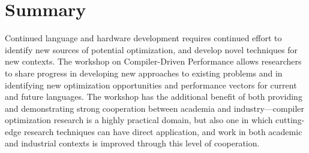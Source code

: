 \documentclass[sigconf]{acmart}
\begin{document}
\section{Summary}
Continued language and hardware development requires continued effort to identify new sources of potential optimization, and develop novel techniques for new contexts. The workshop on Compiler-Driven Performance allows researchers to share progress in developing new approaches to existing problems and in identifying new optimization opportunities and performance vectors for current and future languages. The workshop has the additional benefit of both providing and demonstrating strong cooperation between academia and industry---compiler optimization research is a highly practical domain, but also one in which cutting-edge research techniques can have direct application, and work in both academic and industrial contexts is improved through this level of cooperation.
\end{document}

